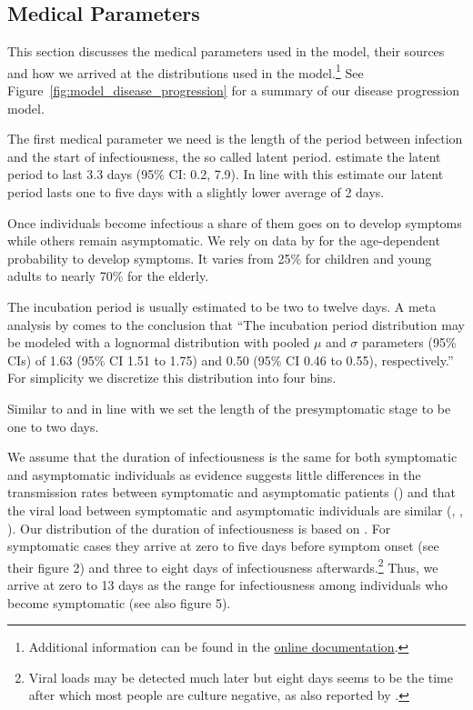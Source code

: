 \subsection{Medical Parameters}
\label{sec:medical_params}

This section discusses the medical parameters used in the model, their sources and how we
arrived at the distributions used in the model.\footnote{Additional information can be
found in the
\href{https://sid-dev.readthedocs.io/en/latest/reference_guides/epi_params.html}{online
documentation}.} See Figure~\ref{fig:model_disease_progression} for a summary of our
disease progression model.



The first medical parameter we need is the length of the period between infection and the
start of infectiousness, the so called latent period. \cite{Zhao2021} estimate the latent
period to last 3.3 days (95\% CI: 0.2, 7.9). In line with this estimate our latent period
lasts one to five days with a slightly lower average of 2 days.

Once individuals become infectious a share of them goes on to develop symptoms while
others remain asymptomatic. We rely on data by \cite{Davies2020} for the age-dependent
probability to develop symptoms. It varies from 25\% for children and young adults to
nearly 70\% for the elderly.

The incubation period is usually estimated to be two to twelve days. A meta analysis by
\citet{McAloon2020} comes to the conclusion that ``The incubation period distribution may
be modeled with a lognormal distribution with pooled $\mu$ and $\sigma$ parameters (95\%
CIs) of 1.63 (95\% CI 1.51 to 1.75) and 0.50 (95\% CI 0.46 to 0.55), respectively.'' For
simplicity we discretize this distribution into four bins.

Similar to \citet{Peak2020} and in line with \citet{He2020} we set the length of the
presymptomatic stage to be one to two days.


We assume that the duration of infectiousness is the same for both symptomatic and
asymptomatic individuals as evidence suggests little differences in the transmission
rates between symptomatic and asymptomatic patients (\citet{Yin2020}) and that the viral
load between symptomatic and asymptomatic individuals are similar (\citet{Zou2020},
\citet{Byrne2020}, \citet{Singanayagam2020}). Our distribution of the duration of
infectiousness is based on \citet{Byrne2020}. For symptomatic cases they arrive at zero
to five days before symptom onset (see their figure 2) and three to eight days of
infectiousness afterwards.\footnote{Viral loads may be detected much later but eight days
seems to be the time after which most people are culture negative, as also reported by
\citet{Singanayagam2020}.} Thus, we arrive at zero to 13 days as the range for
infectiousness among individuals who become symptomatic (see also figure 5).

